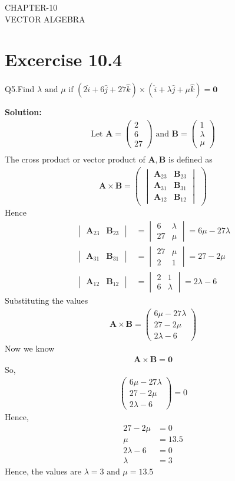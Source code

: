\documentclass[12pt]{article}
\newcommand{\mydet}[1]{\ensuremath{\begin{vmatrix}#1\end{vmatrix}}}
\newcommand{\solution}{\noindent \textbf{Solution: }}
\newcommand{\myvec}[1]{\ensuremath{\begin{pmatrix}#1\end{pmatrix}}}
\let\vec\mathbf
\begin{document}
\begin{center}
\textbf\large{CHAPTER-10 \\ VECTOR ALGEBRA}

\end{center}
\section*{Excercise 10.4}

Q5.Find $\lambda \text{ and } \mu \text{ if } (2\hat{i}+6\hat{j}+27\hat{k}) \times (\hat{i}+\lambda \hat{j}+\mu \hat{k})=\vec{0}$

\solution
\begin{align}
	\text{Let } \vec{A} = \myvec{2\\6\\27} \text{ and } \vec{B} = \myvec{1\\ \lambda \\ \mu}\\
\end{align}
The cross product or vector product of $\vec{A},\vec{B}$ is defined as
\begin{align}
	\vec{A} \times \vec{B} = \myvec{\mydet{\vec{A}_{23}&\vec{B}_{23}\\\vec{A}_{31}&\vec{B}_{31}\\\vec{A}_{12}&\vec{B}_{12}}}
\end{align}
Hence
\begin{align}
	\mydet{\vec{A}_{23}&\vec{B}_{23}}&=\mydet{6&\lambda\\27&\mu}=6\mu-27\lambda\\
	\mydet{\vec{A}_{31}&\vec{B}_{31}}&=\mydet{27&\mu\\2&1}=27-2\mu\\
	\mydet{\vec{A}_{12}&\vec{B}_{12}}&=\mydet{2&1\\6&\lambda}=2\lambda-6
\end{align}
Substituting the values
\begin{align}
	\vec{A}\times\vec{B}=\myvec{6\mu-27\lambda\\27-2\mu\\2\lambda-6}
\end{align}
Now we know
\begin{align}
	\vec{A} \times \vec{B} = \vec{0}
\end{align}
So,
\begin{align}
	\myvec{6\mu-27\lambda\\27-2\mu\\2\lambda-6}=0
\end{align}
Hence,
\begin{align}
	27-2\mu&=0\\
	\mu&=13.5\\
	2\lambda-6&=0\\
	\lambda&=3
\end{align}
Hence, the values are $\lambda = 3 \text{ and } \mu = 13.5$
\end{document}
